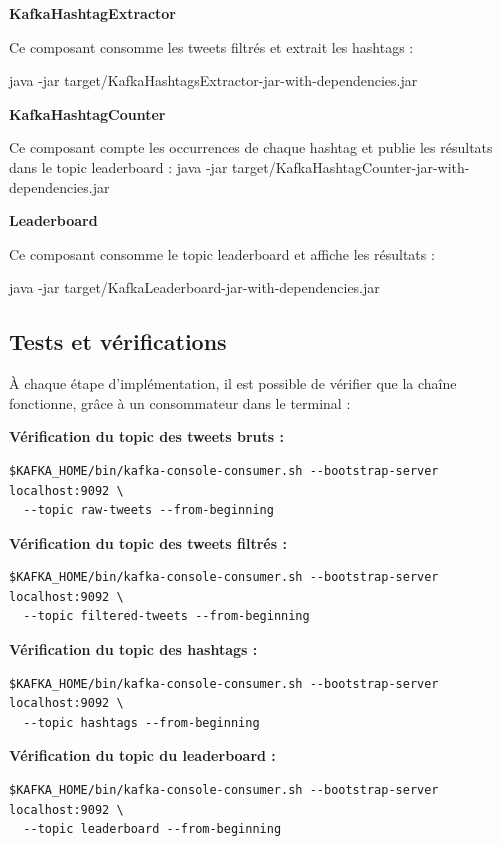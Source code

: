 \documentclass[10pt,a4paper]{article}
\begin{document}
\textbf{KafkaHashtagExtractor}

Ce composant consomme les tweets filtrés et extrait les hashtags :

java -jar target/KafkaHashtagsExtractor-jar-with-dependencies.jar

\textbf{KafkaHashtagCounter}

Ce composant compte les occurrences de chaque hashtag et publie les résultats dans le topic leaderboard :
java -jar target/KafkaHashtagCounter-jar-with-dependencies.jar

\textbf{Leaderboard}

Ce composant consomme le topic leaderboard et affiche les résultats :

java -jar target/KafkaLeaderboard-jar-with-dependencies.jar

\subsection{Tests et vérifications}

À chaque étape d'implémentation, il est possible de vérifier que la chaîne fonctionne, grâce à un consommateur dans le terminal :

\textbf{Vérification du topic des tweets bruts :}

\begin{verbatim}
$KAFKA_HOME/bin/kafka-console-consumer.sh --bootstrap-server localhost:9092 \
  --topic raw-tweets --from-beginning
\end{verbatim}

\textbf{Vérification du topic des tweets filtrés :}

\begin{verbatim}
$KAFKA_HOME/bin/kafka-console-consumer.sh --bootstrap-server localhost:9092 \
  --topic filtered-tweets --from-beginning
\end{verbatim}

\textbf{Vérification du topic des hashtags :}

\begin{verbatim}
$KAFKA_HOME/bin/kafka-console-consumer.sh --bootstrap-server localhost:9092 \
  --topic hashtags --from-beginning
\end{verbatim}

\textbf{Vérification du topic du leaderboard :}

\begin{verbatim}
$KAFKA_HOME/bin/kafka-console-consumer.sh --bootstrap-server localhost:9092 \
  --topic leaderboard --from-beginning
\end{verbatim}
\end{document}
